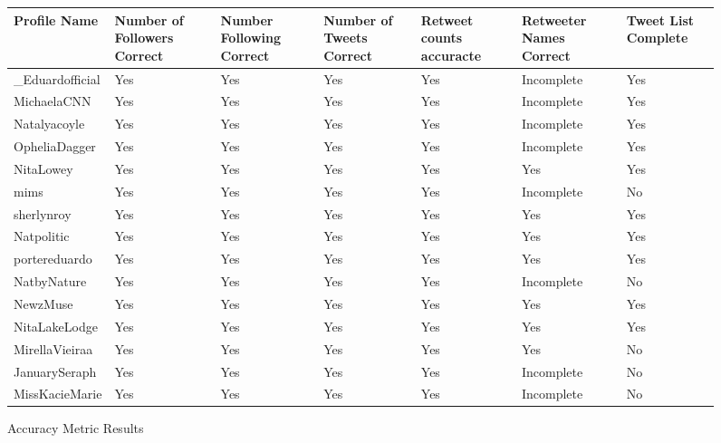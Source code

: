 \begin{figure}
\begin{center}
 \begin{tabular}{| p{3cm} | p{3cm}| p{3cm} | p{3cm} | p{3cm} | p{3cm} | p{2cm} |}
 \hline
 \textbf{Profile Name} & \textbf{Number of Followers Correct} & \textbf{Number Following Correct} & \textbf{Number of Tweets Correct} & \textbf{Retweet counts accuracte} & \textbf{Retweeter Names Correct} & \textbf{Tweet List Complete}\\ \hline
\_Eduardofficial & Yes & Yes & Yes & Yes & Incomplete & Yes\\ \hline
 MichaelaCNN & Yes & Yes & Yes & Yes & Incomplete & Yes \\ \hline
 Natalyacoyle & Yes & Yes & Yes & Yes & Incomplete & Yes \\ \hline
 OpheliaDagger & Yes & Yes & Yes & Yes & Incomplete & Yes \\ \hline
 NitaLowey & Yes & Yes & Yes & Yes & Yes & Yes  \\ \hline
 mims & Yes & Yes & Yes & Yes & Incomplete & No \\ \hline
 sherlynroy & Yes & Yes & Yes & Yes & Yes & Yes \\ \hline
 Natpolitic & Yes & Yes & Yes & Yes & Yes & Yes \\ \hline
 portereduardo & Yes & Yes & Yes & Yes & Yes & Yes \\ \hline
 NatbyNature & Yes & Yes & Yes & Yes & Incomplete & No \\ \hline
 NewzMuse & Yes & Yes & Yes & Yes & Yes & Yes \\ \hline
 NitaLakeLodge & Yes & Yes & Yes & Yes & Yes & Yes \\ \hline
 MirellaVieiraa & Yes & Yes & Yes & Yes & Yes & No \\ \hline
 JanuarySeraph & Yes & Yes & Yes & Yes & Incomplete & No \\ \hline
 MissKacieMarie & Yes & Yes & Yes & Yes & Incomplete & No \\ \hline
 \end{tabular}
\end{center}
\caption{Accuracy Metric Results}
\end{figure}

